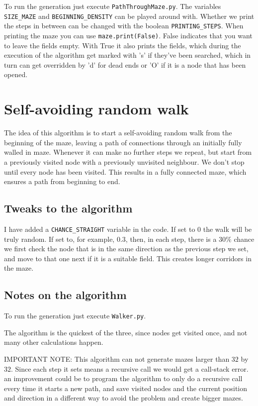 \documentclass[10pt, a4paper, twoside]{amsart}
\newcommand{\1}{\mathbbm{1}}
\begin{document}
To run the generation just execute \verb+PathThroughMaze.py+. The variables \verb+SIZE_MAZE+ and \verb+BEGINNING_DENSITY+ can be played around with. Whether we print the steps in between can be changed with the boolean \verb+PRINTING_STEPS+. When printing the maze you can use \verb+maze.print(False)+. False indicates that you want to leave the fields empty. With True it also prints the fields, which during the execution of the algorithm get marked with 's' if they've been searched, which in turn can get overridden by 'd' for dead ends or 'O' if it is a node that has been opened.\\


\section{Self-avoiding random walk}
The idea of this algorithm is to start a self-avoiding random walk from the beginning of the maze, leaving a path of connections through an initially fully walled in maze. Whenever it can make no further steps we repeat, but start from a previously visited node with a previously unvisited neighbour. We don't stop until  every node has been visited. This results in a fully connected maze, which ensures a path from beginning to end.

\subsection{Tweaks to the algorithm}
I have added a \verb+CHANCE_STRAIGHT+ variable in the code. If set to $0$ the walk will be truly random. If set to, for example, $0.3$, then, in each step, there is a $30\%$ chance we first check the node that is in the same direction as the previous step we set, and move to that one next if it is a suitable field. This creates longer corridors in the maze.

\subsection*{Notes on the algorithm}
To run the generation just execute \verb+Walker.py+.

The algorithm is the quickest of the three, since nodes get visited once, and not many other calculations happen.

IMPORTANT NOTE: This algorithm can not generate mazes larger than $32$ by $32$. Since each step it sets means a recursive call we would get a call-stack error. an improvement could be to program the algorithm to only do a recursive call every time it starts a new path, and save visited nodes and the current position and direction in a different way to avoid the problem and create bigger mazes.
\end{document}

